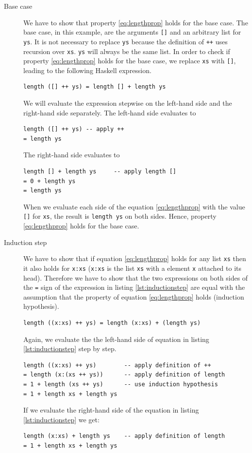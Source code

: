 \begin{description}
\item[Base case]
We have to show that property \ref{eq:lengthprop} holds for the base case. The base case, in this example, are the arguments \verb|[]| and an arbitrary list for \verb|ys|. It is not necessary to replace \verb|ys| because the definition of \verb|++| uses recursion over \verb|xs|. \verb|ys| will always be the same list.
In order to check if property \ref{eq:lengthprop} holds for the base case, we replace \verb|xs| with  \verb|[]|, leading to the following Haskell expression.

\begin{verbatim}
length ([] ++ ys) = length [] + length ys
\end{verbatim}

We will evaluate the expression stepwise on the left-hand side and the right-hand side separately.
The left-hand side evaluates to

\begin{verbatim}
length ([] ++ ys) -- apply ++
= length ys
\end{verbatim}

The right-hand side evaluates to 

\begin{verbatim}
length [] + length ys     -- apply length []
= 0 + length ys
= length ys
\end{verbatim}

When we evaluate each side of the equation \ref{eq:lengthprop} with the value \verb|[]| for \verb|xs|, the result is \verb|length ys| on both sides. Hence, property \ref{eq:lengthprop} holds for the base case.

\item[Induction step]
We have to show that if equation \ref{eq:lengthprop} holds for any list \verb|xs| then it also holds for \verb|x:xs| (\verb|x:xs| is the list \verb|xs| with a  element \verb|x| attached to its head). Therefore we have to show that the two expressions on both sides of the \verb|=| sign of the  expression in listing \ref{lst:inductionstep} are equal with the assumption that the property of equation \ref{eq:lengthprop} holds (induction hypothesis).
\begin{lstlisting}[caption={Equality expression for induction step},label={lst:inductionstep}]
length ((x:xs) ++ ys) = length (x:xs) + (length ys)
\end{lstlisting}
Again, we evaluate the the left-hand side of equation in listing \ref{lst:inductionstep} step by step.
\begin{verbatim}
length ((x:xs) ++ ys)        -- apply definition of ++
= length (x:(xs ++ ys))      -- apply definition of length
= 1 + length (xs ++ ys)      -- use induction hypothesis
= 1 + length xs + length ys
\end{verbatim}
If we evaluate the right-hand side of the equation in listing \ref{lst:inductionstep} we get:
\begin{verbatim}
length (x:xs) + length ys    -- apply definition of length
= 1 + length xs + length ys
\end{verbatim}


\end{description}
